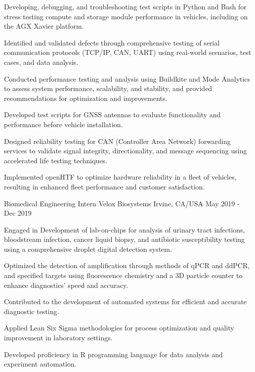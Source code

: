 \begin{cventries}
      {
        \begin{cvitems} %
          \item {Developing, debugging, and troubleshooting test scripts in Python and Bash for stress testing compute and storage module performance in vehicles, including on the AGX Xavier platform.}
          \item {Identified and validated defects through comprehensive testing of serial communication protocols (TCP/IP, CAN, UART) using real-world scenarios, test cases, and data analysis.}
          \item {Conducted performance testing and analysis using Buildkite and Mode Analytics to assess system performance, scalability, and stability, and provided recommendations for optimization and improvements.}
          \item {Developed test scripts for GNSS antennas to evaluate functionality and performance before vehicle installation.}
          \item {Designed reliability testing for CAN (Controller Area Network) forwarding services to validate signal integrity, directionality, and message sequencing using accelerated life testing techniques.}
          \item {Implemented openHTF to optimize hardware reliability in a fleet of vehicles, resulting in enhanced fleet performance and customer satisfaction.}
        \end{cvitems}
      }
  \cventry
      {Biomedical Engineering Intern} %
      {Velox Biosystems} %
      {Irvine, CA/USA} %
      {May 2019 - Dec 2019} %
      {
        \begin{cvitems} %
          \item {Engaged in Development of lab-on-chips for analysis of urinary tract infections, bloodstream infection, cancer liquid biopsy, and antibiotic susceptibility testing using a comprehensive droplet digital detection system.}
          \item {Optimized the detection of amplification through methods of qPCR and ddPCR, and specified targets using fluorescence chemistry and a 3D particle counter to enhance diagnostics' speed and accuracy.}
          \item {Contributed to the development of automated systems for efficient and accurate diagnostic testing.}
          \item {Applied Lean Six Sigma methodologies for process optimization and quality improvement in laboratory settings.}
          \item {Developed proficiency in R programming language for data analysis and experiment automation.}
        \end{cvitems}
      }

\end{cventries}
